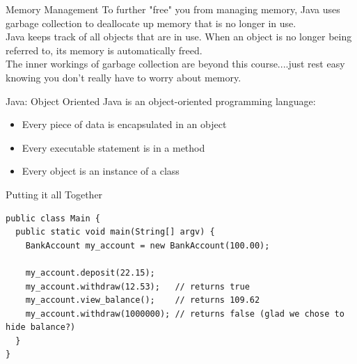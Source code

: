 \documentclass{beamer}
\begin{document}
\begin{frame}[fragile]{Memory Management}
To further "free" you from managing memory, Java uses garbage collection to deallocate up memory that is no longer in use. \\
\vspace{1em}
Java keeps track of all objects that are in use. When an object is no longer being referred to, its memory is automatically freed. \\
\vspace{1em}
The inner workings of garbage collection are beyond this course....just rest easy knowing you don't really have to worry about memory. \\
\end{frame}



\begin{frame}{Java: Object Oriented}
Java is an object-oriented programming language: \\
\begin{itemize}
\item Every piece of data is encapsulated in an object
\item Every executable statement is in a method
\item Every object is an instance of a class
\end{itemize}
\end{frame}



\begin{frame}[fragile]{Putting it all Together}
\centering
\begin{Verbatim}[fontsize=\tiny]
public class Main {
  public static void main(String[] argv) {
    BankAccount my_account = new BankAccount(100.00);
      
    my_account.deposit(22.15);
    my_account.withdraw(12.53);   // returns true
    my_account.view_balance();    // returns 109.62
    my_account.withdraw(1000000); // returns false (glad we chose to hide balance?)
  }
}
\end{Verbatim}
\end{frame}
\end{document}
